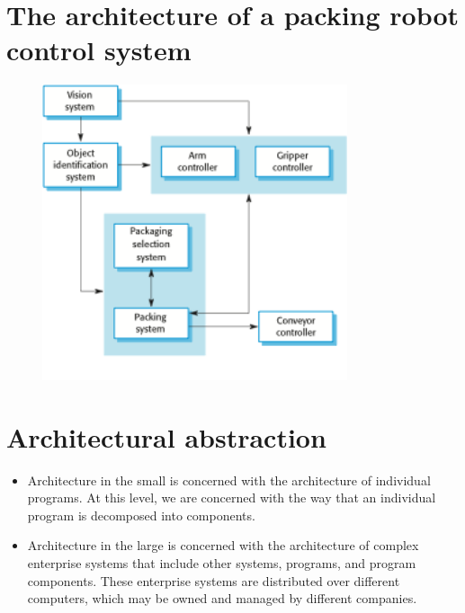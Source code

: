 \section{The architecture of a packing robot control system}
\begin{figure}[h!]
    \centering
    \includegraphics[width = 0.8\textwidth]{./figures/L3_1.png}
    \caption{}
    \label{fig:L3_1}
\end{figure}

\section{Architectural abstraction}
\begin{itemize}

\item Architecture in the small is concerned with the architecture of individual programs. At this level, we are concerned with the way that an individual program is decomposed into components.

\item Architecture in the large is concerned with the architecture of complex enterprise systems that include other systems, programs, and program components. These enterprise systems are distributed over different computers, which may be owned and managed by different companies.


\end{itemize}
